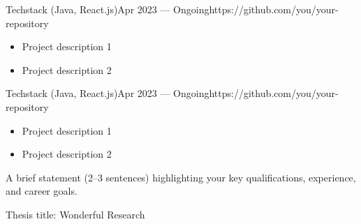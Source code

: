 \documentclass[10pt,a4paper,ragged2e,withhyper]{nextcv}
\begin{document}
\begin{paracol}{2}
{Techstack (Java, React.js)}{Apr 2023 --- Ongoing}{https://github.com/you/your-repository}
\begin{itemize}
  \item Project description 1
  \item Project description 2
\end{itemize}

\divider%

{Techstack (Java, React.js)}{Apr 2023 --- Ongoing}{https://github.com/you/your-repository}
\begin{itemize}
  \item Project description 1
  \item Project description 2
\end{itemize}

\switchcolumn%


A brief statement (2--3 sentences) highlighting your key qualifications, experience, and career goals.

\medskip



Thesis title: Wonderful Research

\divider%


\divider%


\medskip



\medskip%
\medskip%

\divider\smallskip

\\

\divider\smallskip


\end{paracol}
\end{document}
